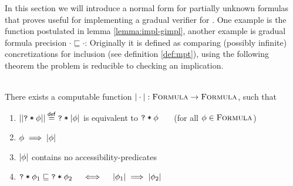 In this section we will introduce a normal form for partially unknown formulas that proves useful for implementing a gradual verifier for \gvlidf.
One example is the function postulated in lemma \ref{lemma:impl-gimpl}, another example is gradual formula precision $\cdot \sqsubseteq \cdot$:
Originally it is defined as comparing (possibly infinite) concretizations for inclusion (see definition \ref{def:mpt}), using the following theorem the problem is reducible to checking an implication.

\begin{theorem}\label{thm:gnf}~\\
    There exists a computable function $|\cdot| : \textup{\textsc{Formula}} \rightarrow \textup{\textsc{Formula}}$, such that
    \begin{enumerate}
        \item $||\textup{\texttt{\textup{\texttt{?}}\:*\:\ensuremath{\phi}}}|| \overset{\textup{\textmd{\textsf{def}}}}{=} \textup{\texttt{\textup{\texttt{?}}\:*\:\ensuremath{|\phi|}}}$ is equivalent to $\textup{\texttt{\textup{\texttt{?}}\:*\:\ensuremath{\phi}}}$ ~~~(for all $\phi \in \textup{\textsc{Formula}}$)
        \item $\phi \implies |\phi|$
        \item $|\phi|$ contains no accessibility-predicates
        \item $\textup{\texttt{\textup{\texttt{?}}\:*\:\ensuremath{\phi_1}}} \sqsubseteq \textup{\texttt{\textup{\texttt{?}}\:*\:\ensuremath{\phi_2}}}  \quad\iff\quad  |\phi_1| \implies |\phi_2|$
    \end{enumerate}
\end{theorem}